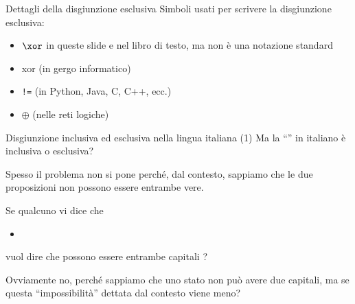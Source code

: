 \documentclass[aspectratio=169,10pt,dvipsnames,handout]{beamer}
\begin{document}
\begin{frame}{Dettagli della disgiunzione esclusiva}
    Simboli usati per scrivere la disgiunzione esclusiva:
    \begin{itemize}
        \item \alert{$\xor$ in queste slide e nel libro di testo}, ma non è una notazione standard
        \item \alert{xor (in gergo informatico)}
        \item \alert{\texttt{!=} (in Python, Java, C, C++, ecc.)}
        \item $\oplus$ (nelle reti logiche)
    \end{itemize}

\end{frame}

\begin{frame}{Disgiunzione inclusiva ed esclusiva nella lingua italiana (1)}
    Ma la ``'' in italiano è inclusiva o esclusiva?

    \pause
    \medskip
    Spesso il problema non si pone perché, dal contesto, sappiamo che le due proposizioni non possono essere entrambe vere.
    \begin{example}
        Se qualcuno vi dice che
        \begin{itemize}
            \item {}
        \end{itemize}
        vuol dire che possono essere entrambe capitali ?
    \end{example}

    \pause
    Ovviamente no, perché sappiamo che uno stato non può avere due capitali, ma se questa ``impossibilità'' dettata dal contesto viene meno?

\end{frame}
\end{document}
